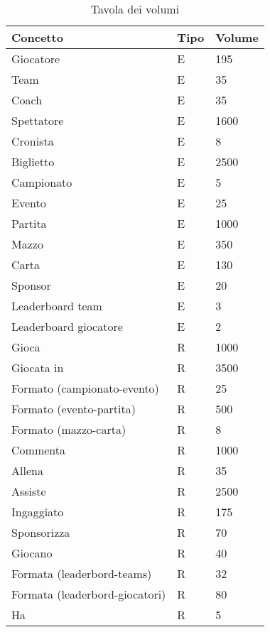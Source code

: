 \documentclass{article}
\begin{document}
\begin{table}
\centering
\begin{tabularx}{\textwidth}{|l|X|X|}
\hline 
\textbf{Concetto} & \textbf{Tipo} & \textbf{Volume} \\ \hline
Giocatore & E & 195 \\ \hline %
Team & E & 35 \\ \hline %
Coach & E & 35 \\ \hline %
Spettatore & E & 1600 \\ \hline %
Cronista & E & 8 \\ \hline %
Biglietto & E & 2500 \\ \hline %
Campionato & E & 5 \\ \hline %
Evento & E & 25 \\ \hline %
Partita & E & 1000 \\ \hline  %
Mazzo & E & 350 \\ \hline %
Carta & E & 130 \\ \hline %
Sponsor & E & 20 \\ \hline %
Leaderboard team & E & 3 \\ \hline %
Leaderboard giocatore & E & 2 \\ \hline %

Gioca & R & 1000 \\ \hline %
Giocata in & R & 3500 \\ \hline %
Formato (campionato-evento) & R & 25 \\ \hline  %
Formato (evento-partita) & R & 500 \\ \hline %
Formato (mazzo-carta) & R & 8 \\ \hline %
Commenta & R & 1000 \\ \hline %
Allena  & R & 35 \\ \hline %
Assiste & R & 2500 \\ \hline %
Ingaggiato & R & 175 \\ \hline %
Sponsorizza & R & 70 \\ \hline %
Giocano & R & 40 \\ \hline %
Formata (leaderbord-teams) & R & 32 \\ \hline %
Formata (leaderbord-giocatori) & R & 80 \\ \hline %
Ha & R & 5 \\ \hline %
\end{tabularx}
\caption{Tavola dei volumi}
\label{table_volumi}
\end{table}
\end{document}
